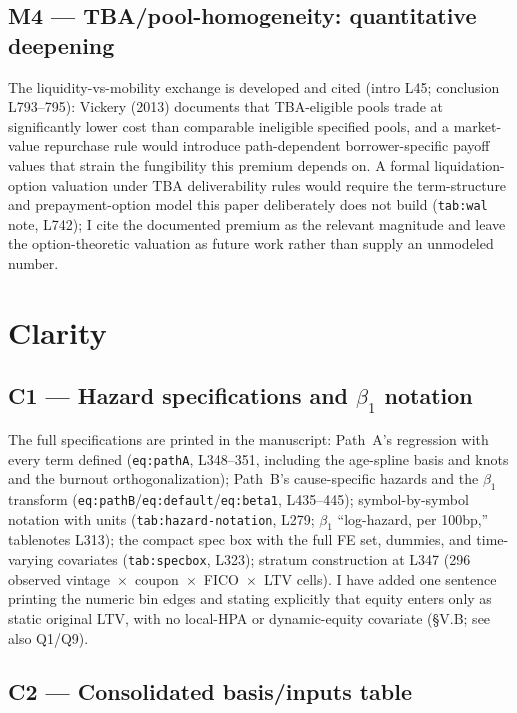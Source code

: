 \documentclass[11pt]{article}
\newcommand{\mlabel}[1]{\texttt{#1}}
\begin{document}
\subsection*{M4 --- TBA/pool-homogeneity: quantitative deepening}

The liquidity-vs-mobility exchange is developed and cited (intro L45;
conclusion L793--795): Vickery (2013) documents that TBA-eligible pools trade
at significantly lower cost than comparable ineligible specified pools, and a
market-value repurchase rule would introduce path-dependent borrower-specific
payoff values that strain the fungibility this premium depends on. A formal
liquidation-option valuation under TBA deliverability rules would require the
term-structure and prepayment-option model this paper deliberately does not
build (\mlabel{tab:wal} note, L742); I cite the documented premium as the
relevant magnitude and leave the option-theoretic valuation as future work
rather than supply an unmodeled number.

\section*{Clarity}

\subsection*{C1 --- Hazard specifications and $\beta_1$ notation}

The full specifications are printed in the manuscript: Path~A's regression
with every term defined (\mlabel{eq:pathA}, L348--351, including the age-spline
basis and knots and the burnout orthogonalization); Path~B's cause-specific
hazards and the $\beta_1$ transform
(\mlabel{eq:pathB}/\mlabel{eq:default}/\mlabel{eq:beta1}, L435--445);
symbol-by-symbol notation with units (\mlabel{tab:hazard-notation}, L279;
$\beta_1$ ``log-hazard, per 100bp,'' tablenotes L313); the compact spec box
with the full FE set, dummies, and time-varying covariates
(\mlabel{tab:specbox}, L323); stratum construction at L347 (296 observed
vintage~$\times$~coupon~$\times$~FICO~$\times$~LTV cells). I have added one
sentence printing the numeric bin edges and stating explicitly that equity
enters only as static original LTV, with no local-HPA or dynamic-equity
covariate (\S V.B; see also Q1/Q9).

\subsection*{C2 --- Consolidated basis/inputs table}
\end{document}
